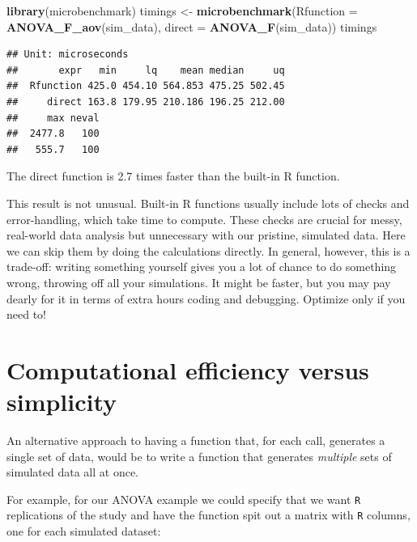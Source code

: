 \documentclass[
]{book}
\newenvironment{Shaded}{\begin{snugshade}}{\end{snugshade}}
\newcommand{\AttributeTok}[1]{\textcolor[rgb]{0.13,0.29,0.53}{#1}}
\newcommand{\FunctionTok}[1]{\textcolor[rgb]{0.13,0.29,0.53}{\textbf{#1}}}
\newcommand{\NormalTok}[1]{#1}
\newcommand{\OtherTok}[1]{\textcolor[rgb]{0.56,0.35,0.01}{#1}}
\begin{document}
\begin{Shaded}
\begin{Highlighting}[]
\FunctionTok{library}\NormalTok{(microbenchmark)}
\NormalTok{timings }\OtherTok{\textless{}{-}} \FunctionTok{microbenchmark}\NormalTok{(}\AttributeTok{Rfunction =} \FunctionTok{ANOVA\_F\_aov}\NormalTok{(sim\_data),}
                          \AttributeTok{direct    =} \FunctionTok{ANOVA\_F}\NormalTok{(sim\_data))}
\NormalTok{timings}
\end{Highlighting}
\end{Shaded}

\begin{verbatim}
## Unit: microseconds
##       expr   min     lq    mean median     uq
##  Rfunction 425.0 454.10 564.853 475.25 502.45
##     direct 163.8 179.95 210.186 196.25 212.00
##     max neval
##  2477.8   100
##   555.7   100
\end{verbatim}

The direct function is 2.7 times faster than the built-in R function.

This result is not unusual.
Built-in R functions usually include lots of checks and error-handling, which take time to compute. These checks are crucial for messy, real-world data analysis but unnecessary with our pristine, simulated data.
Here we can skip them by doing the calculations directly.
In general, however, this is a trade-off: writing something yourself gives you a lot of chance to do something wrong, throwing off all your simulations. It might be faster, but you may pay dearly for it in terms of extra hours coding and debugging.
Optimize only if you need to!

\section{Computational efficiency versus simplicity}\label{sec_comp_efficiency}

An alternative approach to having a function that, for each call, generates a single set of data, would be to write a function that generates \emph{multiple} sets of simulated data all at once.

For example, for our ANOVA example we could specify that we want \texttt{R} replications of the study and have the function spit out a matrix with \texttt{R} columns, one for each simulated dataset:
\end{document}
